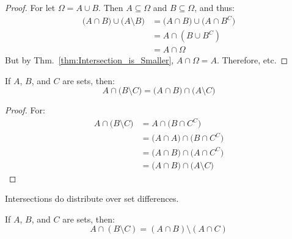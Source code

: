 \documentclass[crop=false,class=book,oneside]{standalone}
\begin{document}
            \begin{proof}
                For let $\Omega=A\cup{B}$. Then
                $A\subseteq\Omega$ and $B\subseteq\Omega$,
                and thus:
                \begin{subequations}
                    \begin{align}
                        \big(A\cap{B})\cup\big(A\setminus{B}\big)
                        &=\big(A\cap{B}\big)
                            \cup\big(A\cap{B}^{C}\big)\\
                        &=A\cap(B\cup{B}^{C})\\
                        &=A\cap\Omega
                    \end{align}
                \end{subequations}
                But by Thm.~\ref{thm:Intersection_is_Smaller},
                $A\cap\Omega=A$. Therefore, etc.
            \end{proof}
            \begin{theorem}
                If $A$, $B$, and $C$ are sets, then:
                \begin{equation}
                    A\cap\big(B\setminus{C}\big)
                    =\big(A\cap{B}\big)\cap\big(A\setminus{C}\big)
                \end{equation}
            \end{theorem}
            \begin{proof}
                For:
                \begin{subequations}
                    \begin{align}
                        A\cap\big(B\setminus{C}\big)
                        &=A\cap\big(B\cap{C}^{C}\big)\\
                        &=\big(A\cap{A}\big)
                            \cap\big(B\cap{C}^{C}\big)\\
                        &=\big(A\cap{B}\big)
                            \cap\big(A\cap{C}^{C}\big)\\
                        &=\big(A\cap{B}\big)
                            \cap\big(A\setminus{C}\big)
                    \end{align}
                \end{subequations}
            \end{proof}
            Intersections do distribute over set differences.
            \begin{theorem}
                If $A$, $B$, and $C$ are sets, then:
                \begin{equation}
                    A\cap(B\setminus{C})=
                    (A\cap{B})\setminus(A\cap{C})
                \end{equation}
            \end{theorem}
\end{document}
